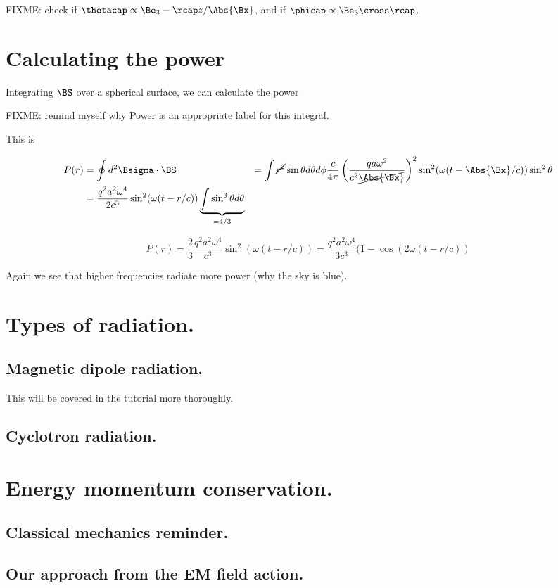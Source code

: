FIXME: check if $\thetacap \propto \Be_3 - \rcap z/\Abs{\Bx}$, and if $\phicap \propto \Be_3 \cross \rcap$.

\section{Calculating the power}

Integrating $\BS$ over a spherical surface, we can calculate the power

FIXME: remind myself why Power is an appropriate label for this integral.

This is

\begin{align*}
P(r) 
&= \oint d^2 \Bsigma \cdot \BS
&= \int \cancel{r^2} \sin\theta d\theta d\phi
\frac{c}{4 \pi}
\left( \frac{q a \omega^2}{c^2 \cancel{\Abs{\Bx}} } \right)^2
\sin^2(\omega (t - \Abs{\Bx}/c)) \sin^2\theta \\
&= 
\frac{q^2 a^2 \omega^4}{2 c^3 }
\sin^2(\omega (t - r/c)) 
\underbrace{\int \sin^3\theta d\theta}_{=4/3} \\
\end{align*}

\begin{equation}\label{eqn:relativisticElectrodynamicsL21:n}
P(r) = \frac{2}{3} \frac{q^2 a^2 \omega^4}{c^3} \sin^2(\omega (t - r/c)) =
\frac{q^2 a^2 \omega^4}{3 c^3} (1 - \cos(2 \omega (t - r/c))
\end{equation}

Again we see that higher frequencies radiate more power (why the sky is blue).

\section{Types of radiation.}
\subsection{Magnetic dipole radiation.}

This will be covered in the tutorial more thoroughly.

\subsection{Cyclotron radiation.}

\section{Energy momentum conservation.}
\subsection{Classical mechanics reminder.}
\subsection{Our approach from the EM field action.}

\EndArticle

